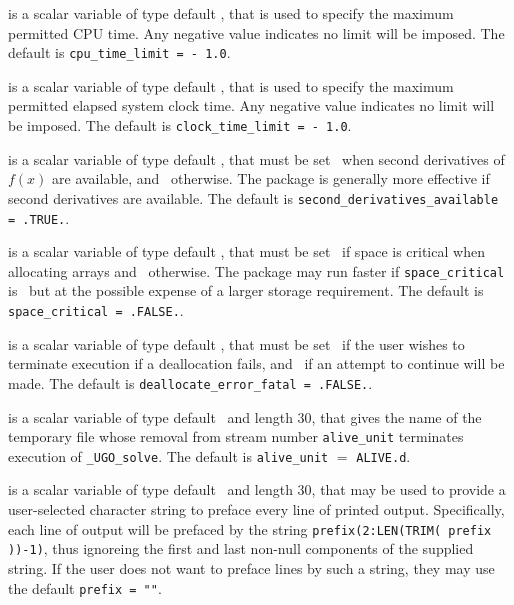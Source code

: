 \documentclass{galahad}
\newcommand{\packagename}{UGO}
\newcommand{\fullpackagename}{\libraryname\_\packagename}
\newcommand{\solver}{{\tt \fullpackagename\_solve}}
\begin{document}
\begin{description}
 is a scalar variable of type default \realdp,
that is used to specify the maximum permitted CPU time. Any negative
value indicates no limit will be imposed. The default is
{\tt cpu\_time\_limit = - 1.0}.

 is a scalar variable of type default \realdp,
that is used to specify the maximum permitted elapsed system clock time.
Any negative value indicates no limit will be imposed. The default is
{\tt clock\_time\_limit = - 1.0}.

 is a scalar variable of type default
\logical, that must be set \true\ when second derivatives of $f(x)$
are available, and  \false\ otherwise. The package is generally more effective
if second derivatives are available.
The default is {\tt second\_derivatives\_available = .TRUE.}.

 is a scalar variable of type default \logical,
that must be set \true\ if space is critical when allocating arrays
and  \false\ otherwise. The package may run faster if
{\tt space\_critical} is \false\ but at the possible expense of a larger
storage requirement. The default is {\tt space\_critical = .FALSE.}.

 is a scalar variable of type default \logical,
that must be set \true\ if the user wishes to terminate execution if
a deallocation  fails, and \false\ if an attempt to continue
will be made. The default is {\tt deallocate\_error\_fatal = .FALSE.}.

 is a scalar variable of type default \character\ and length
30, that gives the name of the temporary file whose removal from stream number
{\tt alive\_unit} terminates execution of \solver.
The default is {\tt alive\_unit} $=$ {\tt ALIVE.d}.

 is a scalar variable of type default \character\
and length 30, that may be used to provide a user-selected
character string to preface every line of printed output.
Specifically, each line of output will be prefaced by the string
{\tt prefix(2:LEN(TRIM( prefix ))-1)},
thus ignoreing the first and last non-null components of the
supplied string. If the user does not want to preface lines by such
a string, they may use the default {\tt prefix = ""}.

\end{description}

\end{document}
